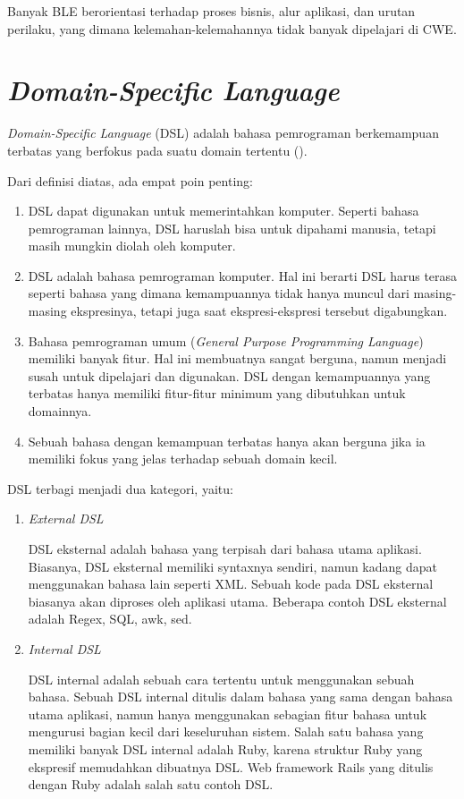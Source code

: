 Banyak BLE berorientasi terhadap proses bisnis, alur aplikasi, dan urutan perilaku,
yang dimana kelemahan-kelemahannya tidak banyak dipelajari di CWE.

\section{\emph{Domain-Specific Language}}

\emph{Domain-Specific Language} (DSL) adalah bahasa pemrograman berkemampuan terbatas yang
berfokus pada suatu domain tertentu (\cite{fowler_dsl}).

Dari definisi diatas, ada empat poin penting:

\begin{enumerate}
    \item DSL dapat digunakan untuk memerintahkan komputer. Seperti bahasa pemrograman lainnya,
    DSL haruslah bisa untuk dipahami manusia, tetapi masih mungkin diolah oleh komputer.

    \item DSL adalah bahasa pemrograman komputer. Hal ini berarti DSL harus terasa seperti
    bahasa yang dimana kemampuannya tidak hanya muncul dari masing-masing ekspresinya,
    tetapi juga saat ekspresi-ekspresi tersebut digabungkan.

    \item Bahasa pemrograman umum (\emph{General Purpose Programming Language}) memiliki banyak fitur.
    Hal ini membuatnya sangat berguna, namun menjadi susah untuk dipelajari dan digunakan.
    DSL dengan kemampuannya yang terbatas hanya memiliki fitur-fitur minimum yang dibutuhkan untuk domainnya.

    \item Sebuah bahasa dengan kemampuan terbatas hanya akan berguna jika ia memiliki
    fokus yang jelas terhadap sebuah domain kecil.
\end{enumerate}

DSL terbagi menjadi dua kategori, yaitu:

\begin{enumerate}
    \item \emph{External DSL}

    DSL eksternal adalah bahasa yang terpisah dari bahasa utama aplikasi.
    Biasanya, DSL eksternal memiliki syntaxnya sendiri, namun kadang dapat menggunakan
    bahasa lain seperti XML. Sebuah kode pada DSL eksternal biasanya akan diproses oleh
    aplikasi utama. Beberapa contoh DSL eksternal adalah Regex, SQL, awk, sed.

    \item \emph{Internal DSL}
    
    DSL internal adalah sebuah cara tertentu untuk menggunakan sebuah bahasa.
    Sebuah DSL internal ditulis dalam bahasa yang sama dengan bahasa utama aplikasi,
    namun hanya menggunakan sebagian fitur bahasa untuk mengurusi bagian kecil 
    dari keseluruhan sistem. Salah satu bahasa yang memiliki banyak DSL internal adalah Ruby,
    karena struktur Ruby yang ekspresif memudahkan dibuatnya DSL.
    Web framework Rails yang ditulis dengan Ruby adalah salah satu contoh DSL.
\end{enumerate}

